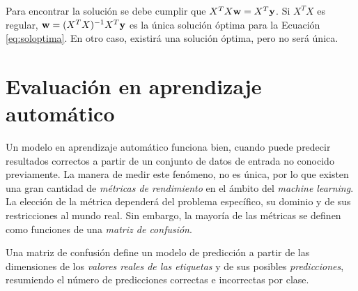 \documentclass[oneside,openright,titlepage,numbers=noenddot,openany,headinclude,footinclude=true,
cleardoublepage=empty,abstractoff,BCOR=5mm,paper=a4,fontsize=12pt,main=spanish]{scrreprt}
\begin{document}
Para encontrar la solución se debe cumplir que $X^TX\textbf{w}=X^T\textbf{y}$. Si $X^TX$ es regular, $\textbf{w}=(X^TX)^{-1}X^T \textbf{y}$ es la única solución óptima para la Ecuación \ref{eq:soloptima}. En otro caso, existirá una solución óptima, pero no será única.

\section{Evaluación en aprendizaje automático}

\label{sec:evalaa}

Un modelo en aprendizaje automático funciona bien, cuando puede predecir resultados correctos a partir de un conjunto de datos de entrada no conocido previamente. La manera de medir este fenómeno, no es única, por lo que existen una gran cantidad de \textit{métricas de rendimiento} en el ámbito del \textit{machine learning}. La elección de la métrica dependerá del problema específico, su dominio y de sus restricciones al mundo real. Sin embargo, la mayoría de las métricas se definen como funciones de una \textit{matriz de confusión}. 

Una matriz de confusión define un modelo de predicción a partir de las dimensiones de los \textit{valores reales de las etiquetas} y de sus posibles \textit{predicciones}, resumiendo el número de predicciones correctas e incorrectas por clase.\\
\end{document}
